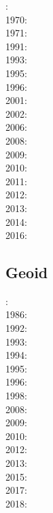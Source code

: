 {\scriptsize
{}: \cite{ramb68}\\
1970: \cite{ramb70}\\
1971: \cite{ramb71}\\
1991: \cite{flet91}\\
1993: \cite{zhhj93}\\
1995: \cite{flet95}\\
1996: \cite{zhho96}\\
2001: \cite{scpo01}\\
2002: \cite{mumh02}\\
2006: \cite{frsc06}\\
2008: \cite{schm08}\\
2009: \cite{simp09}\\
2010: \cite{resb10}\\
2011: \cite{freh11}\\
2012: \cite{reds12}\cite{grsc12}\cite{scsc12}\\
2013: \cite{regc13}\\
2014: \cite{freh14}\cite{frex14}\\
2016: \cite{frsc16}
}

\subsection{Geoid}

{\scriptsize
{}: \cite{davi84}\cite{hage84}\cite{riff84}\\
1986: \cite{davi86}\\
1992: \cite{zhgu92}\cite{kiha92}\\
1993: \cite{zhch93}\cite{rirl93}\\
1994: \cite{kiha94}\\
1995: \cite{king95}\cite{mopa95}\\
1996: \cite{mogu96}\\
1998: \cite{cava98}\cite{chki98}\\
2008: \cite{meco08}\\
2009: \cite{king09}\\
2010: \cite{ghbz10}\cite{spgs10b}\\
2012: \cite{hibi12}\\
2013: \cite{shsc13}\\
2015: \cite{lizh15}\\
2017: \cite{grab17}\\
2018: \cite{king18}
}

